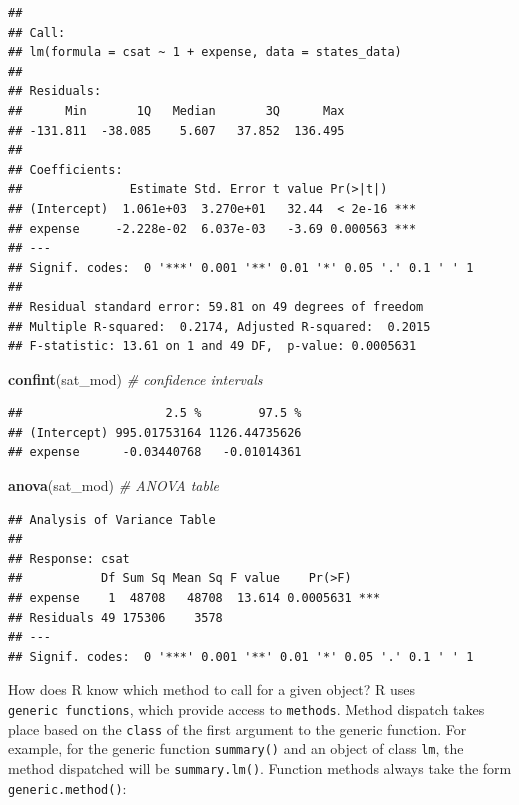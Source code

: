 \documentclass[]{book}
\newenvironment{Shaded}{\begin{snugshade}}{\end{snugshade}}
\newcommand{\CommentTok}[1]{\textcolor[rgb]{0.56,0.35,0.01}{\textit{#1}}}
\newcommand{\KeywordTok}[1]{\textcolor[rgb]{0.13,0.29,0.53}{\textbf{#1}}}
\newcommand{\NormalTok}[1]{#1}
\begin{document}
\begin{verbatim}
## 
## Call:
## lm(formula = csat ~ 1 + expense, data = states_data)
## 
## Residuals:
##      Min       1Q   Median       3Q      Max 
## -131.811  -38.085    5.607   37.852  136.495 
## 
## Coefficients:
##               Estimate Std. Error t value Pr(>|t|)    
## (Intercept)  1.061e+03  3.270e+01   32.44  < 2e-16 ***
## expense     -2.228e-02  6.037e-03   -3.69 0.000563 ***
## ---
## Signif. codes:  0 '***' 0.001 '**' 0.01 '*' 0.05 '.' 0.1 ' ' 1
## 
## Residual standard error: 59.81 on 49 degrees of freedom
## Multiple R-squared:  0.2174, Adjusted R-squared:  0.2015 
## F-statistic: 13.61 on 1 and 49 DF,  p-value: 0.0005631
\end{verbatim}

\begin{Shaded}
\begin{Highlighting}[]
  \KeywordTok{confint}\NormalTok{(sat_mod) }\CommentTok{# confidence intervals}
\end{Highlighting}
\end{Shaded}

\begin{verbatim}
##                    2.5 %        97.5 %
## (Intercept) 995.01753164 1126.44735626
## expense      -0.03440768   -0.01014361
\end{verbatim}

\begin{Shaded}
\begin{Highlighting}[]
  \KeywordTok{anova}\NormalTok{(sat_mod) }\CommentTok{# ANOVA table  }
\end{Highlighting}
\end{Shaded}

\begin{verbatim}
## Analysis of Variance Table
## 
## Response: csat
##           Df Sum Sq Mean Sq F value    Pr(>F)    
## expense    1  48708   48708  13.614 0.0005631 ***
## Residuals 49 175306    3578                      
## ---
## Signif. codes:  0 '***' 0.001 '**' 0.01 '*' 0.05 '.' 0.1 ' ' 1
\end{verbatim}

How does R know which method to call for a given object? R uses \texttt{generic\ functions}, which provide access to \texttt{methods}. Method dispatch takes place based on the \texttt{class} of the first argument to the generic function. For example, for the generic function \texttt{summary()} and an object of class \texttt{lm}, the method dispatched will be \texttt{summary.lm()}. Function methods always take the form \texttt{generic.method()}:
\end{document}
